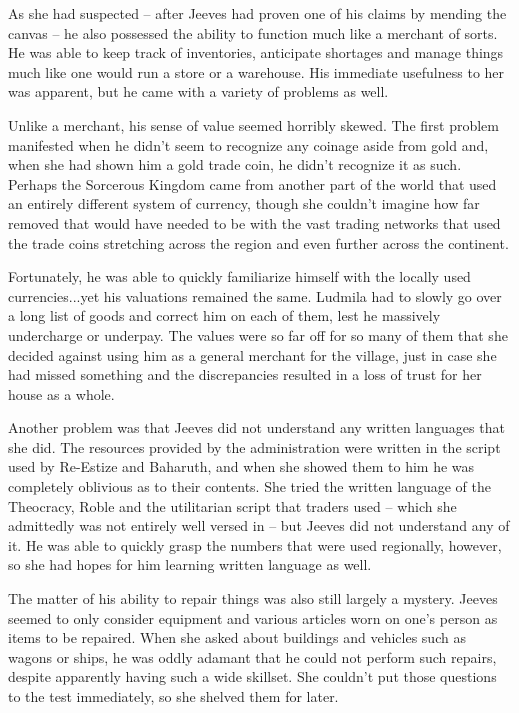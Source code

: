  

As she had suspected – after Jeeves had proven one of his claims by mending the canvas – he also possessed the ability to function much like a merchant of sorts. He was able to keep track of inventories, anticipate shortages and manage things much like one would run a store or a warehouse. His immediate usefulness to her was apparent, but he came with a variety of problems as well.

 

Unlike a merchant, his sense of value seemed horribly skewed. The first problem manifested when he didn’t seem to recognize any coinage aside from gold and, when she had shown him a gold trade coin, he didn’t recognize it as such. Perhaps the Sorcerous Kingdom came from another part of the world that used an entirely different system of currency, though she couldn’t imagine how far removed that would have needed to be with the vast trading networks that used the trade coins stretching across the region and even further across the continent.

 

Fortunately, he was able to quickly familiarize himself with the locally used currencies...yet his valuations remained the same. Ludmila had to slowly go over a long list of goods and correct him on each of them, lest he massively undercharge or underpay. The values were so far off for so many of them that she decided against using him as a general merchant for the village, just in case she had missed something and the discrepancies resulted in a loss of trust for her house as a whole.

 

Another problem was that Jeeves did not understand any written languages that she did. The resources provided by the administration were written in the script used by Re-Estize and Baharuth, and when she showed them to him he was completely oblivious as to their contents. She tried the written language of the Theocracy, Roble and the utilitarian script that traders used – which she admittedly was not entirely well versed in – but Jeeves did not understand any of it. He was able to quickly grasp the numbers that were used regionally, however, so she had hopes for him learning written language as well.

 

The matter of his ability to repair things was also still largely a mystery. Jeeves seemed to only consider equipment and various articles worn on one’s person as items to be repaired. When she asked about buildings and vehicles such as wagons or ships, he was oddly adamant that he could not perform such repairs, despite apparently having such a wide skillset. She couldn’t put those questions to the test immediately, so she shelved them for later.


